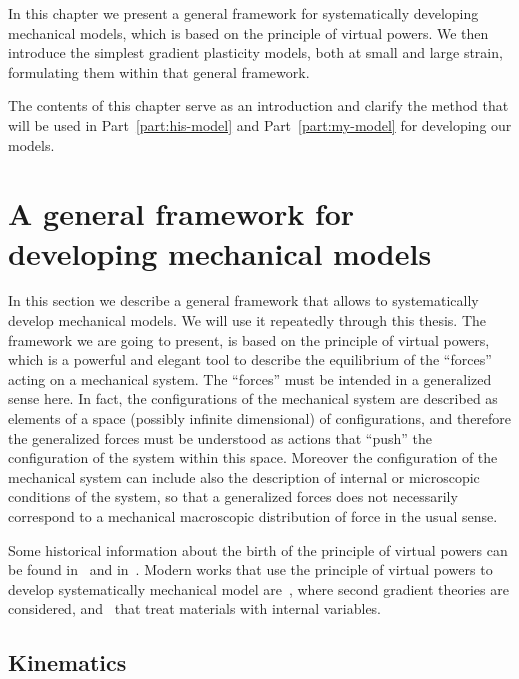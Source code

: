 \documentclass[a4paper,10pt,oneside]{amsbook}
\numberwithin{section}{chapter}
\numberwithin{equation}{chapter}
\theoremstyle{definition}
\begin{document}
In this chapter we present a general framework for systematically developing mechanical models, which is based on the principle of virtual powers. We then introduce the simplest gradient plasticity models, both at small and large strain, formulating them within that general framework.

The contents of this chapter serve as an introduction and clarify the method that will be used in Part~\ref{part:his-model} and Part~\ref{part:my-model} for developing our models.

\section{A general framework for developing mechanical models}
\label{sec:ppv}

In this section we describe a general framework that allows to systematically develop mechanical models. We will use it repeatedly through this thesis. The framework we are going to present, is based on the principle of virtual powers, which is a powerful and elegant tool to describe the equilibrium of the ``forces'' acting on a mechanical system. The ``forces'' must be intended in a generalized sense here. In fact, the configurations of the mechanical system are described as elements of a space (possibly infinite dimensional) of configurations, and therefore the generalized forces must be understood as actions that ``push'' the configuration of the system within this space. Moreover the configuration of the mechanical system can include also the description of internal or microscopic conditions of the system, so that a generalized forces does not necessarily correspond to a mechanical macroscopic distribution of force in the usual sense.

Some historical information about the birth of the principle of virtual powers can be found in~\cite{ppv-encyclopedia} and in~\cite{ppv-maugin}. Modern works that use the principle of virtual powers to develop systematically mechanical model are~\cite{germain,gurtin-fried,gurtin-fried-turbulence}, where second gradient theories are considered, and~\cite{gurtin-anand-small,gurtin-anand-large,non-smooth-thermomechanics} that treat materials with internal variables.

\subsection{Kinematics}
\end{document}
